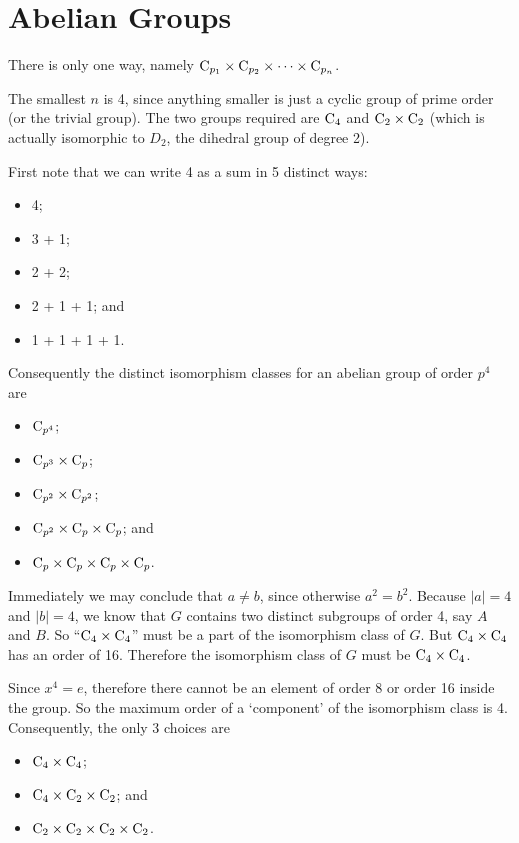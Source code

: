 \section{Abelian Groups}
\begin{questions}
    \item There is only one way, namely $\mathrm{C}_{p_1}\times\mathrm{C}_{p_2}\times\cdots\times\mathrm{C}_{p_n}$.

    \item The smallest $n$ is 4, since anything smaller is just a cyclic group of prime order (or the trivial group). The two groups required are $\mathrm{C}_{4}$ and $\mathrm{C}_{2} \times \mathrm{C}_{2}$ (which is actually isomorphic to $D_2$, the dihedral group of degree 2).

    \item First note that we can write 4 as a sum in 5 distinct ways:
    \begin{itemize}
        \item 4;
        \item 3 + 1;
        \item 2 + 2;
        \item 2 + 1 + 1; and
        \item 1 + 1 + 1 + 1.
    \end{itemize}
    Consequently the distinct isomorphism classes for an abelian group of order $p^4$ are
    \begin{itemize}
        \item $\mathrm{C}_{p^4}$;
        \item $\mathrm{C}_{p^3}\times\mathrm{C}_{p}$;
        \item $\mathrm{C}_{p^2}\times\mathrm{C}_{p^2}$;
        \item $\mathrm{C}_{p^2}\times\mathrm{C}_{p}\times\mathrm{C}_{p}$; and
        \item $\mathrm{C}_{p}\times\mathrm{C}_{p}\times\mathrm{C}_{p}\times\mathrm{C}_{p}$.
    \end{itemize}

    \item Immediately we may conclude that $a \neq b$, since otherwise $a^2 = b^2$. Because $|a| = 4$ and $|b| = 4$, we know that $G$ contains two distinct subgroups of order 4, say $A$ and $B$. So ``$\mathrm{C}_{4} \times \mathrm{C}_{4}$'' must be a part of the isomorphism class of $G$. But $\mathrm{C}_{4} \times \mathrm{C}_{4}$ has an order of 16. Therefore the isomorphism class of $G$ must be $\mathrm{C}_{4} \times \mathrm{C}_{4}$.

    \item Since $x^4 = e$, therefore there cannot be an element of order 8 or order 16 inside the group. So the maximum order of a `component' of the isomorphism class is 4. Consequently, the only 3 choices are
    \begin{itemize}
        \item $\mathrm{C}_{4}\times\mathrm{C}_{4}$;
        \item $\mathrm{C}_{4}\times\mathrm{C}_{2}\times\mathrm{C}_{2}$; and
        \item $\mathrm{C}_{2}\times\mathrm{C}_{2}\times\mathrm{C}_{2}\times\mathrm{C}_{2}$.
    \end{itemize}
\end{questions}
